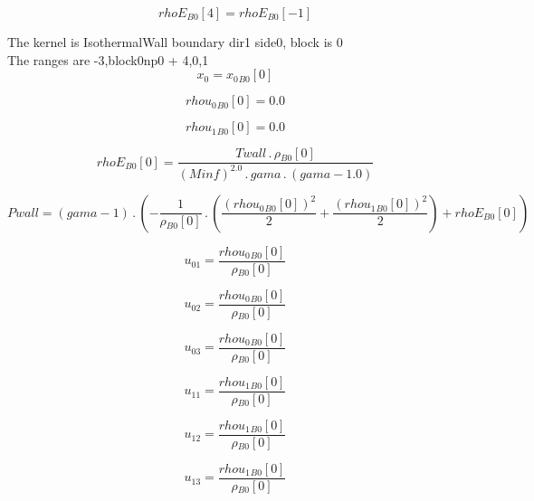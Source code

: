 \documentclass{article}
\begin{document}
\begin{dmath}{rhoE{_{B0}}}[{4}] = {rhoE{_{B0}}}[{-1}]\end{dmath}

\noindent The kernel is IsothermalWall boundary dir1 side0, block is 0\\\noindent The ranges are -3,block0np0 + 4,0,1\\\begin{dmath}x_{0} = {x_{0}{_{B0}}}[{0}]\end{dmath}

\begin{dmath}{rhou_{0}{_{B0}}}[{0}] = 0.0\end{dmath}

\begin{dmath}{rhou_{1}{_{B0}}}[{0}] = 0.0\end{dmath}

\begin{dmath}{rhoE{_{B0}}}[{0}] = \frac{Twall \,.\, {\rho{_{B0}}}[{0}]}{\left(Minf \right)^{2.0} \,.\, gama \,.\, \left(gama - 1.0\right)}\end{dmath}

\begin{dmath}Pwall = \left(gama - 1\right) \,.\, \left(- \frac{1}{{\rho{_{B0}}}[{0}]} \,.\, \left(\frac{\left({rhou_{0}{_{B0}}}[{0}] \right)^{2}}{2} + \frac{\left({rhou_{1}{_{B0}}}[{0}] \right)^{2}}{2}\right) + {rhoE{_{B0}}}[{0}]\right)\end{dmath}

\begin{dmath}u_{01} = \frac{{rhou_{0}{_{B0}}}[{0}]}{{\rho{_{B0}}}[{0}]}\end{dmath}

\begin{dmath}u_{02} = \frac{{rhou_{0}{_{B0}}}[{0}]}{{\rho{_{B0}}}[{0}]}\end{dmath}

\begin{dmath}u_{03} = \frac{{rhou_{0}{_{B0}}}[{0}]}{{\rho{_{B0}}}[{0}]}\end{dmath}

\begin{dmath}u_{11} = \frac{{rhou_{1}{_{B0}}}[{0}]}{{\rho{_{B0}}}[{0}]}\end{dmath}

\begin{dmath}u_{12} = \frac{{rhou_{1}{_{B0}}}[{0}]}{{\rho{_{B0}}}[{0}]}\end{dmath}

\begin{dmath}u_{13} = \frac{{rhou_{1}{_{B0}}}[{0}]}{{\rho{_{B0}}}[{0}]}\end{dmath}
\end{document}

